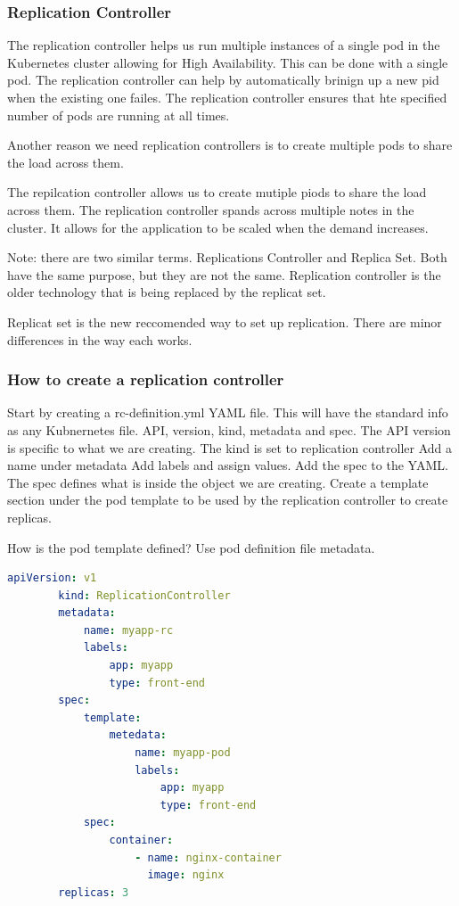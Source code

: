 \documentclass[11pt]{book}
\begin{document}
    \subsubsection{Replication Controller}
    The replication controller helps us run multiple instances of a single pod in the Kubernetes cluster allowing for High Availability.
    This can be done with a single pod. The replication controller can help by automatically brinign up a new pid when the existing one failes.
    The replication controller ensures that hte specified number of pods are running at all times.

    Another reason we need replication controllers is to create multiple pods to share the load across them.

    The repilcation controller allows us to create mutiple piods to share the load across them.
    The replication controller spands across multiple notes in the cluster.
    It allows for the application to be scaled when the demand increases.

    Note: there are two similar terms. Replications Controller and Replica Set.
    Both have the same purpose, but they are not the same.
    Replication controller is the older technology that is being replaced by the replicat set.

    Replicat set is the new reccomended way to set up replication.
    There are minor differences in the way each works.

    \subsubsection{How to create a replication controller}
    Start by creating a rc-definition.yml YAML file.
    This will have the standard info as any Kubnernetes file. API, version, kind, metadata and spec.
    The API version is specific to what we are creating.
    The kind is set to replication controller
    Add a name under metadata
    Add labels and assign values.
    Add the spec to the YAML. The spec defines what is inside the object we are creating.
    Create a template section under the pod template to be used by the replication controller to create replicas.

    How is the pod template defined?
    Use pod definition file metadata.


    \begin{lstlisting}[language=yaml, caption={Replication controller}]
        apiVersion: v1
        kind: ReplicationController
        metadata:
            name: myapp-rc
            labels:
                app: myapp
                type: front-end
        spec:
            template:
                metedata:
                    name: myapp-pod
                    labels:
                        app: myapp
                        type: front-end
            spec:
                container:
                    - name: nginx-container
                      image: nginx
        replicas: 3
    \end{lstlisting}
\end{document}
